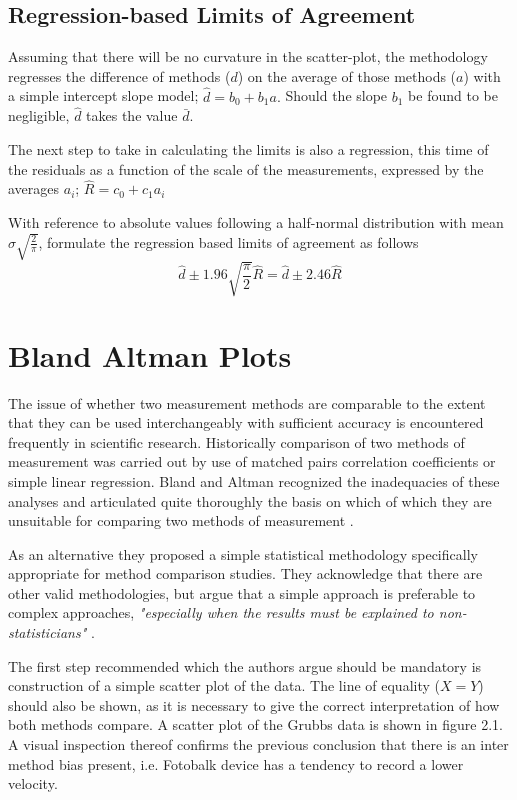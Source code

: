\documentclass[Main.tex]{subfiles}
\begin{document}
	\subsection{Regression-based Limits of Agreement} Assuming that
	there will be no curvature in the scatter-plot, the methodology
	regresses the difference of methods ($d$) on the average of those
	methods ($a$) with a simple intercept slope model; $\hat{d} =
	b_{0}+ b_{1}a.$ Should the slope $b_{1}$ be found to be
	negligible, $\hat{d}$ takes the value $\bar{d}$.
	
	The next step to take in calculating the limits is also a
	regression, this time of the residuals as a function of the scale
	of the measurements, expressed by the averages $a_{i}$;
	$ \hat{R} = c_{0}+ c_{1}a_{i}$
	
	With reference to absolute values following a half-normal
	distribution with mean $\sigma\sqrt{\frac{2}{\pi}}$, \citet{BA99} formulate the regression based limits of agreement as
	follows
	\begin{equation}
	\hat{d} \pm 1.96\sqrt{\frac{\pi}{2}}\hat{R} = \hat{d} \pm 2.46\hat{R}
	\end{equation}





	\section{Bland Altman Plots}
	The issue of whether two measurement methods are comparable to the
	extent that they can be used interchangeably with sufficient
	accuracy is encountered frequently in scientific research.
	Historically comparison of two methods of measurement was carried
	out by use of matched pairs correlation coefficients or simple
	linear regression. Bland and Altman recognized the inadequacies of
	these analyses and articulated quite thoroughly the basis on which
	of which they are unsuitable for comparing two methods of
	measurement \citep*{BA83}.
	
	As an alternative they proposed a simple statistical methodology
	specifically appropriate for method comparison studies. They
	acknowledge that there are other valid methodologies, but argue
	that a simple approach is preferable to complex approaches,
	\emph{"especially when the results must be explained to
		non-statisticians"} \citep*{BA83}.
	
	The first step recommended which the authors argue should be
	mandatory is construction of a simple scatter plot of the data.
	The line of equality ($X=Y$) should also be shown, as it is
	necessary to give the correct interpretation of how both methods
	compare. A scatter plot of the Grubbs data is shown in figure 2.1.
	A visual inspection thereof confirms the previous conclusion that
	there is an inter method bias present, i.e. Fotobalk device has a
	tendency to record a lower velocity.
	
\end{document}
